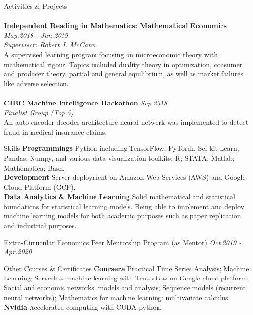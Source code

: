 \documentclass{resume} %
\begin{document}
\begin{rSection}{Activities \& Projects}
\\
\\{\bf Independent Reading in Mathematics: Mathematical Economics} \hfill \emph{May.2019 - Jun.2019}
\\ \emph{Supervisor: Robert J. McCann}
\\
A supervised learning program focusing on microeconomic theory with mathematical rigour. Topics included duality theory in optimization, consumer and producer theory, partial and general equilibrium, as well as market failures like adverse selection.
\\
\\{\bf CIBC Machine Intelligence Hackathon} \hfill \emph{Sep.2018}
\\ \emph{Finalist Group (Top 5)}
\\
An auto-encoder-decoder architecture neural network was implemented to detect fraud in medical insurance claims.
\\

\end{rSection}

\begin{rSection}{Skills}
\textbf{Programmings} Python including TensorFlow, PyTorch, Sci-kit Learn, Pandas, Numpy, and various data visualization toolkits; R; STATA; Matlab; Mathematica; Bash.
\\\textbf{Development} Server deployment on Amazon Web Services (AWS) and Google Cloud Platform (GCP).
\\\textbf{Data Analytics \& Machine Learning} Solid mathematical and statistical foundations for statistical learning models. Being able to implement and deploy machine learning models for both academic purposes such as paper replication and industrial purposes.
\end{rSection}

\begin{rSection}{Extra-Cirrucular} 
	Economics Peer Mentorship Program (as Mentor) \hfill \emph{Oct.2019 - Apr.2020}
\end{rSection}

\begin{rSection}{Other Courses \& Certificates}
	\textbf{Coursera} Practical Time Series Analysis; Machine Learning; Serverless machine learning with Tensorflow on Google cloud platform; Social and economic networks: models and analysis; Sequence models (recurrent neural networks); Mathematics for machine learning: multivariate calculus.
	\\
	\textbf{Nvidia} Accelerated computing with CUDA python.
\end{rSection}
\end{document}
